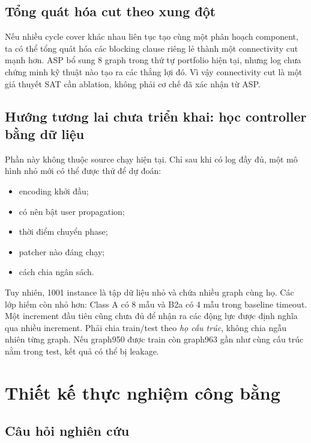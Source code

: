 \documentclass[11pt,a4paper,oneside]{scrreprt}
\begin{document}
\section{Tổng quát hóa cut theo xung đột}

Nếu nhiều cycle cover khác nhau liên tục tạo cùng một phân hoạch component, ta có thể tổng quát hóa các blocking clause riêng lẻ thành một connectivity cut mạnh hơn. ASP bổ sung 8 graph trong thứ tự portfolio hiện tại, nhưng log chưa chứng minh kỹ thuật nào tạo ra các thắng lợi đó. Vì vậy connectivity cut là một giả thuyết SAT cần ablation, không phải cơ chế đã xác nhận từ ASP.

\section{Hướng tương lai chưa triển khai: học controller bằng dữ liệu}

Phần này không thuộc source chạy hiện tại. Chỉ sau khi có log đầy đủ, một mô hình nhỏ mới có thể được thử để dự đoán:

\begin{itemize}
  \item encoding khởi đầu;
  \item có nên bật user propagation;
  \item thời điểm chuyển phase;
  \item patcher nào đáng chạy;
  \item cách chia ngân sách.
\end{itemize}

Tuy nhiên, 1001 instance là tập dữ liệu nhỏ và chứa nhiều graph cùng họ. Các lớp hiếm còn nhỏ hơn: Class A có 8 mẫu và B2a có 4 mẫu trong baseline timeout. Một increment đầu tiên cũng chưa đủ để nhận ra các động lực được định nghĩa qua nhiều increment. Phải chia train/test theo \emph{họ cấu trúc}, không chia ngẫu nhiên từng graph. Nếu graph950 được train còn graph963 gần như cùng cấu trúc nằm trong test, kết quả có thể bị leakage.

\chapter{Thiết kế thực nghiệm công bằng}

\section{Câu hỏi nghiên cứu}
\end{document}
